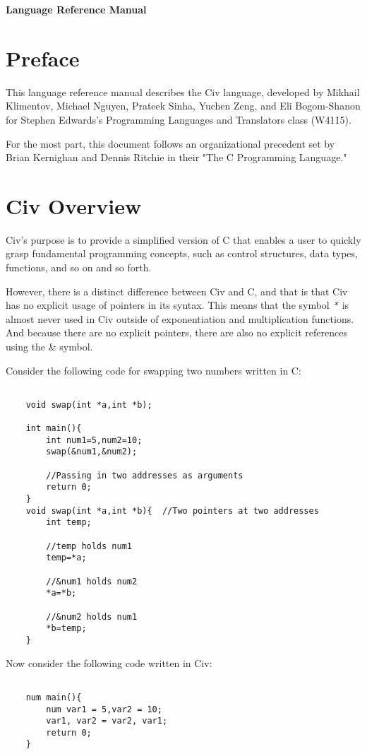 \documentclass[a4paper]{article}
\def \authors{Mikhail Klimentov, Michael Nguyen, Prateek Sinha, Yuchen Zeng, and Eli Bogom-Shanon }
\begin{document}
\textbf{\huge{Language Reference Manual}}

\section{Preface}

This language reference manual describes the Civ language, developed by \authors for Stephen Edwards's Programming Languages and Translators class (W4115). 

For the most part, this document follows an organizational precedent set by Brian Kernighan and Dennis Ritchie in their "The C Programming Language." 

\section{Civ Overview}

Civ's purpose is to provide a simplified version of C that enables a user to quickly grasp fundamental programming concepts, such as control structures, data types, functions, and so on and so forth.

However, there is a distinct difference between Civ and C, and that is that Civ has no explicit usage of pointers in its syntax. This means that the symbol $\emph{*}$ is almost never used in Civ outside of exponentiation and multiplication functions. And because there are no explicit pointers, there are also no explicit references using the \& symbol.

Consider the following code for swapping two numbers written in C:

{\selectfont
\begin{lstlisting}

	void swap(int *a,int *b);

	int main(){
		int num1=5,num2=10;
		swap(&num1,&num2);
        
        //Passing in two addresses as arguments
		return 0;
	}
	void swap(int *a,int *b){  //Two pointers at two addresses
  		int temp;
        
        //temp holds num1
  		temp=*a;
        
        //&num1 holds num2
 	 	*a=*b;
        
        //&num2 holds num1
  		*b=temp;
	}
\end{lstlisting}
}

Now consider the following code written in Civ:

{\selectfont
\begin{lstlisting}
    
	num main(){
		num var1 = 5,var2 = 10;
		var1, var2 = var2, var1;
		return 0;
	}
\end{lstlisting}
} 
\end{document}
